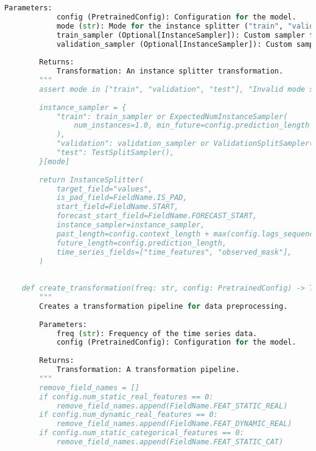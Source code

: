 \begin{lstlisting}[language=Python, caption={Code for creating data loaders for efficient training and evaluation}, breaklines=true, label=code4]
        Parameters:
            config (PretrainedConfig): Configuration for the model.
            mode (str): Mode for the instance splitter ("train", "validation", "test").
            train_sampler (Optional[InstanceSampler]): Custom sampler for training.
            validation_sampler (Optional[InstanceSampler]): Custom sampler for validation.
    
        Returns:
            Transformation: An instance splitter transformation.
        """
        assert mode in ["train", "validation", "test"], "Invalid mode specified"
    
        instance_sampler = {
            "train": train_sampler or ExpectedNumInstanceSampler(
                num_instances=1.0, min_future=config.prediction_length
            ),
            "validation": validation_sampler or ValidationSplitSampler(min_future=config.prediction_length),
            "test": TestSplitSampler(),
        }[mode]
    
        return InstanceSplitter(
            target_field="values",
            is_pad_field=FieldName.IS_PAD,
            start_field=FieldName.START,
            forecast_start_field=FieldName.FORECAST_START,
            instance_sampler=instance_sampler,
            past_length=config.context_length + max(config.lags_sequence),
            future_length=config.prediction_length,
            time_series_fields=["time_features", "observed_mask"],
        )
    
    
    def create_transformation(freq: str, config: PretrainedConfig) -> Transformation:
        """
        Creates a transformation pipeline for data preprocessing.
    
        Parameters:
            freq (str): Frequency of the time series data.
            config (PretrainedConfig): Configuration for the model.
    
        Returns:
            Transformation: A transformation pipeline.
        """
        remove_field_names = []
        if config.num_static_real_features == 0:
            remove_field_names.append(FieldName.FEAT_STATIC_REAL)
        if config.num_dynamic_real_features == 0:
            remove_field_names.append(FieldName.FEAT_DYNAMIC_REAL)
        if config.num_static_categorical_features == 0:
            remove_field_names.append(FieldName.FEAT_STATIC_CAT)
    

\end{lstlisting}
